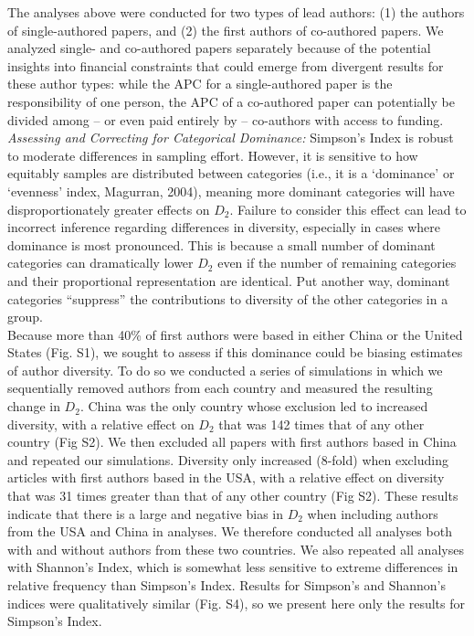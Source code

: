 \documentclass[
  english,
  man]{apa6}
\begin{document}
The analyses above were conducted for two types of lead authors: (1) the authors of single-authored papers, and (2) the first authors of co-authored papers. We analyzed single- and co-authored papers separately because of the potential insights into financial constraints that could emerge from divergent results for these author types: while the APC for a single-authored paper is the responsibility of one person, the APC of a co-authored paper can potentially be divided among -- or even paid entirely by -- co-authors with access to funding.\\
\emph{Assessing and Correcting for Categorical Dominance:} Simpson's Index is robust to moderate differences in sampling effort. However, it is sensitive to how equitably samples are distributed between categories (i.e., it is a {`dominance'} or {`evenness'} index, Magurran, 2004), meaning more dominant categories will have disproportionately greater effects on \(D_{2}\). Failure to consider this effect can lead to incorrect inference regarding differences in diversity, especially in cases where dominance is most pronounced. This is because a small number of dominant categories can dramatically lower \(D_{2}\) even if the number of remaining categories and their proportional representation are identical. Put another way, dominant categories ``suppress'' the contributions to diversity of the other categories in a group.\\
Because more than 40\% of first authors were based in either China or the United States (Fig. S1), we sought to assess if this dominance could be biasing estimates of author diversity. To do so we conducted a series of simulations in which we sequentially removed authors from each country and measured the resulting change in \(D_{2}\). China was the only country whose exclusion led to increased diversity, with a relative effect on \(D_{2}\) that was 142 times that of any other country (Fig S2). We then excluded all papers with first authors based in China and repeated our simulations. Diversity only increased (8-fold) when excluding articles with first authors based in the USA, with a relative effect on diversity that was 31 times greater than that of any other country (Fig S2). These results indicate that there is a large and negative bias in \(D_{2}\) when including authors from the USA and China in analyses. We therefore conducted all analyses both with and without authors from these two countries. We also repeated all analyses with Shannon's Index, which is somewhat less sensitive to extreme differences in relative frequency than Simpson's Index. Results for Simpson's and Shannon's indices were qualitatively similar (Fig. S4), so we present here only the results for Simpson's Index.\\
\end{document}
